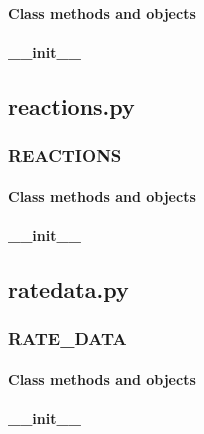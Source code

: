 \documentclass[10pt,a4paper]{article}
\begin{document}
\paragraph{Class methods and objects}
\paragraph{\_\_init\_\_}

\subsection{reactions.py}
\subsubsection{REACTIONS}
\paragraph{Class methods and objects}
\paragraph{\_\_init\_\_}

\subsection{ratedata.py}
\subsubsection{RATE\_DATA}
\paragraph{Class methods and objects}
\paragraph{\_\_init\_\_}
\end{document}
